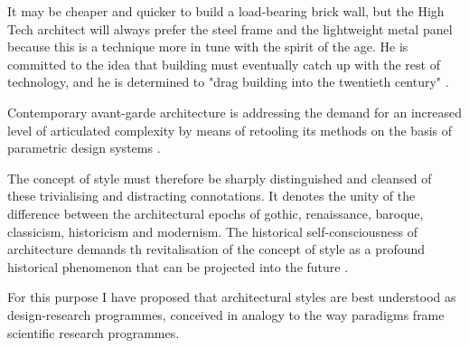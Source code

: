 



It may be cheaper and quicker to build a load-bearing brick wall, but
the High Tech architect will always prefer the steel frame and the lightweight metal panel because this is a technique more in tune with the spirit of the age.
He is committed to the idea that building must eventually catch up with the rest of technology, and he is determined to "drag building into the twentieth century" \cite{Davies1988}.

Contemporary avant-garde architecture is addressing the demand for an increased level of articulated complexity by means of retooling its methods on the basis of parametric design systems \cite{Schumacher2008}.

The concept of style must therefore be sharply distinguished and cleansed of these trivialising and distracting connotations.
It denotes the unity of the difference between the architectural epochs of gothic, renaissance, baroque, classicism, historicism and modernism.
The historical self-consciousness of architecture demands th revitalisation of the concept of style as a profound historical phenomenon that can be projected into the future \cite{Schumacher2010}.

For this purpose I have proposed that architectural styles are best understood as design-research programmes, conceived in analogy to the way paradigms frame scientific research programmes. \cite{Schumacher2010}

